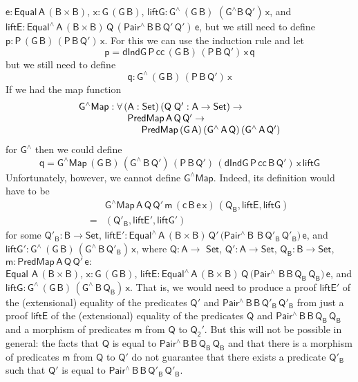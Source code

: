 \documentclass[sigplan,10pt]{acmart}
\begin{document}
$\mathsf{e : Equal\,A\,(B \times B)}$, $\mathsf{x : G\,(G\,B)}$,
$\mathsf{liftG : G^{\wedge}\,(G\,B)}$ $\mathsf{(G^{\wedge}
  B\,Q')\,x}$, and $\mathsf{liftE : Equal^{\wedge}\,A\,(B \times
  B)\,Q\,(Pair^{\wedge}\,B\,B\,Q'\,Q')\,e}$, but we still need to
define $\mathsf{p : P\,(G\,B)\,(P\,B\,Q')\,x}$.  For this we can use
the induction rule and let
\[\mathsf{p = dIndG\,P\,cc\,(G\,B)\,(P\,B\,Q')\,x\,q}\] but we still
need to define \[\mathsf{q : G^{\wedge}\,(G\,B)\,(P\,B\,Q')\,x}\]  If
we had the map function
\[\begin{array}{l}
\mathsf{G^\wedge Map : \forall\, (A : Set)\,
  (Q\;Q' : A \to Set) \to}\\
\hspace*{0.7in}\mathsf{PredMap\,A\,Q\,Q' \to}\\
\hspace*{0.9in}\mathsf{PredMap\,(G\,A)\,(G^{\wedge}\,A\,Q)\,(G^{\wedge}\,A\,Q')} 
\end{array}\]
for $\mathsf{G^{\wedge}}$
then we could define
\[\mathsf{q = G^\wedge Map\,(G\,B)\,(G^{\wedge}\,B\,Q')\,(P\,B\,Q')\,
(dIndG\,P\,cc\,B\,Q')\,x\,liftG}\]  Unfortunately, however,
we cannot define $\mathsf{G^\wedge Map}$. Indeed, its definition would
have to be
\[\begin{array}{ll}
 & \!\!\mathsf{G^\wedge Map\,A\,Q\,Q'\,m\,(c\,B\,e\,x)\,(Q_B,
  liftE, liftG)}\\
\quad\quad= & \!\! \mathsf{(Q'_B, liftE', liftG')}
\end{array}\] for some $\mathsf{Q'_B : B
  \to Set}$, $\mathsf{liftE' : Equal^{\wedge}\,A\,(B \times
  B)\,Q'\,(Pair^{\wedge}\,B}$ $\mathsf{B\,Q'_B\,Q'_B)\,e}$, and
$\mathsf{liftG' : G^{\wedge}\,(G\,B)\,(G^{\wedge}\,B\,Q'_B)\,x}$,
where $\mathsf{Q : A \to}$ $\mathsf{Set}$, $\mathsf{Q' : A \to Set}$,
$\mathsf{Q_B : B \to Set}$, $\mathsf{m : PredMap\,A\,Q\,Q'\,e :
}$\\ $\mathsf{Equal}$ $\mathsf{A\,(B \times B)}$, $\mathsf{x :
  G\,(G\,B)}$, $\mathsf{liftE : Equal^{\wedge}\,A\,(B \times
  B)\,Q\,(Pair^{\wedge}}$ $\mathsf{B\,B\,Q_B\,Q_B)\,e}$, and
$\mathsf{liftG : G^{\wedge}\,(G\,B)\,(G^{\wedge}\,B\,Q_B)\,x}$. 
That is, we would need to produce a proof $\mathsf{liftE'}$ of the
(extensional) equality of the predicates $\mathsf{Q'}$ and
$\mathsf{Pair^{\wedge}\,B\,B\,Q'_B\,Q'_B}$ from just a proof
$\mathsf{liftE}$ of the (extensional) equality of the predicates
$\mathsf{Q}$ and $\mathsf{Pair^{\wedge}\,B\,B\,Q_B\,Q_B}$ and a
morphism of predicates $\mathsf{m}$ from $\mathsf{Q}$ to
$\mathsf{Q_2'}$.
But this will not be possible in general: the facts that $\mathsf{Q}$
is equal to $\mathsf{Pair^{\wedge}\,B\,B\,Q_B\,Q_B}$ and that there is
a morphism of predicates $\mathsf{m}$ from $\mathsf{Q}$ to
$\mathsf{Q'}$ do not guarantee that there exists a predicate
$\mathsf{Q'_B}$ such that $\mathsf{Q'}$ is equal to
$\mathsf{Pair^{\wedge}\,B\,B\,Q'_B\,Q'_B}$.
\end{document}
